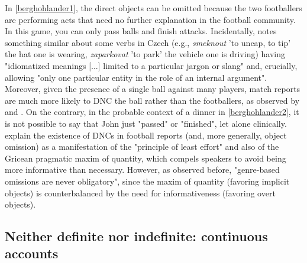In \ref{berghohlander1}, the direct objects can be omitted because the two footballers are performing acts that need no further explanation in the football community. In this game, you can only pass balls and finish attacks. Incidentally, \textcite[266]{Dvorak2017thesis} notes something similar about some verbs in Czech (e.g., \textit{smeknout} 'to uncap, to tip' the hat one is wearing, \textit{zaparkovat} 'to park' the vehicle one is driving) having "idiomatized meanings [...] limited to a particular jargon or slang" and, crucially, allowing "only one particular entity in the role of an internal argument".\\
Moreover, given the presence of a single ball against many players, match reports are much more likely to DNC the ball rather than the footballers, as observed by \textcite[167]{RuppenhoferMichaelis2010} and \textcite{ebeling2021score}. On the contrary, in the probable context of a dinner in \ref{berghohlander2}, it is not possible to say that John just "passed" or "finished", let alone clinically. \textcite[22]{BerghOhlander2016} explain the existence of DNCs in football reports (and, more generally, object omission) as a manifestation of the "principle of least effort" \parencite{zipf1949leasteffort} and also of the Gricean pragmatic maxim of quantity, which compels speakers to avoid being more informative than necessary. However, as \textcite[166]{RuppenhoferMichaelis2010} observed before, "genre-based omissions are never obligatory", since the maxim of quantity (favoring implicit objects) is counterbalanced by the need for informativeness (favoring overt objects).


\subsection{Neither definite nor indefinite: continuous accounts} 

